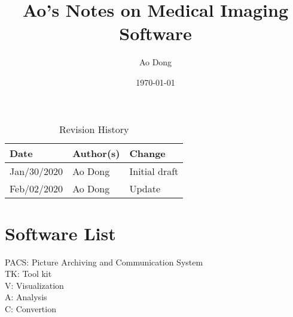 \documentclass{article}
\title{Ao's Notes on Medical Imaging Software}
\author{Ao Dong}
\date{\today}
\begin{document}
\maketitle

\begin{table}[hp]
\caption{Revision History} \label{TblRevisionHistory}
\begin{tabularx}{\textwidth}{llX}
\toprule
\textbf{Date} & \textbf{Author(s)} & \textbf{Change}\\
\midrule
Jan/30/2020 & Ao Dong & Initial draft\\
Feb/02/2020 & Ao Dong & Update\\
\bottomrule
\end{tabularx}
\end{table}

\section{Software List}
PACS: Picture Archiving and Communication System\\
TK: Tool kit\\
V: Visualization\\
A: Analysis\\
C: Convertion
\end{document}
